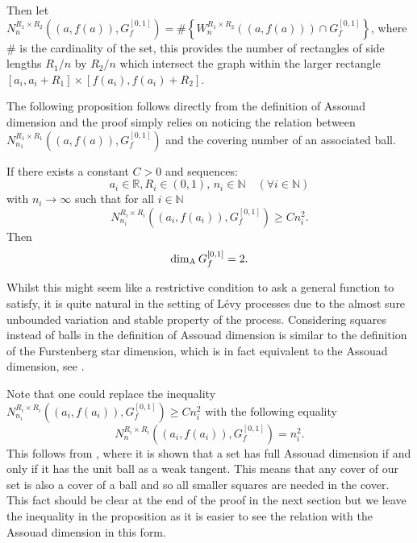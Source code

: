 Then let $N_{n}^{R_1 \times R_2 }((a,f(a)),G_f^{[0,1]})= \# \left\{ W_{n}^{R_1\times R_2}((a,f(a))) \cap G_f^{[0,1]} \right\}$, where $\#$ is the cardinality of the set, this provides the number of rectangles of side lengths $R_1/n$ by $R_2/n$ which intersect the graph within the larger rectangle $[a_i, a_i + R_1] \times [f(a_i), f(a_i) + R_2]$.


The following proposition follows directly from the definition of Assouad dimension and the proof simply relies on noticing the relation between \newline$N_{n_1}^{R_1 \times R_1 }((a,f(a)),G_f^{[0,1]})$ and the covering number of an associated ball.


\begin{proposition}\label{graph}
	If there exists a constant $C>0$ and sequences:
	\[
	a_i\in \mathbb{R},R_i\in (0,1),\, n_i\in\mathbb{N} \quad (\forall i\in \mathbb{N})
	\]
	with $n_i \rightarrow \infty$ such that for all $i\in\mathbb{N}$
	\[
	N_{n_i}^{R_i \times R_i }((a_i,f(a_i)),G_f^{[0,1]})\geq C n_i^2.
	\]
	Then
	\[
	\dim_{\textup{A}} G_f^{[0,1]}=2.
	\]
\end{proposition}

Whilst this might seem like a restrictive condition to ask a general function to satisfy, it is quite natural in the setting of L\'evy processes due to the almost sure unbounded variation and stable property of the process. Considering squares instead of balls in the definition of Assouad dimension is similar to the definition of the Furstenberg star dimension, which is in fact equivalent to the Assouad dimension, see \cite{chenwuwu}.

Note that one could replace the inequality $N_{n_i}^{R_i \times R_i }((a_i,f(a_i)),G_f^{[0,1]})\geq C n_i^2$ with the following equality
\[
N_{n}^{R_i \times R_i }((a_i,f(a_i)),G_f^{[0,1]})= n_i^2.
\]
This follows from \cite[Theorem 2.4]{FY}, where it is shown that a set has full Assouad dimension if and only if it has the unit ball as a weak tangent. This means that any cover of our set is also a cover of a ball and so all smaller squares are needed in the cover. This fact should be clear at the end of the proof in the next section but we leave the inequality in the proposition as it is easier to see the relation with the Assouad dimension in this form.


